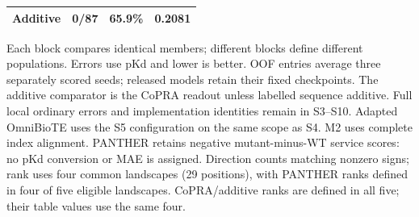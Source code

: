 \begin{table}[p]
\begin{tabularx}{\textwidth}{@{}Yrrr@{}}
Additive & 0/87 & 65.9\% & 0.2081 \\
\bottomrule
\end{tabularx}
\par\vspace{4pt}
\noindent\begin{minipage}{\textwidth}\fontsize{7.5}{9.5}\selectfont
Each block compares identical members; different blocks define different populations. Errors use pKd and lower is better. OOF entries average three separately scored seeds; released models retain their fixed checkpoints. The additive comparator is the CoPRA readout unless labelled sequence additive. Full local ordinary errors and implementation identities remain in S3--S10. Adapted OmniBioTE uses the S5 configuration on the same scope as S4. M2 uses complete index alignment. PANTHER retains negative mutant-minus-WT service scores: no pKd conversion or MAE is assigned. Direction counts matching nonzero signs; rank uses four common landscapes (29 positions), with PANTHER ranks defined in four of five eligible landscapes. CoPRA/additive ranks are defined in all five; their table values use the same four.\par
\end{minipage}\endgroup
\end{table}